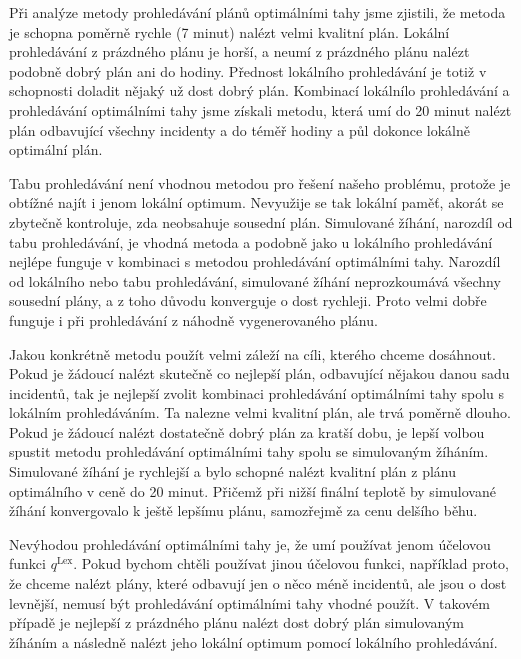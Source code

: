 Při analýze metody prohledávání plánů optimálními tahy jsme zjistili, že metoda je schopna poměrně rychle (7 minut) nalézt velmi kvalitní plán.
Lokální prohledávání z prázdného plánu je horší, a neumí z prázdného plánu nalézt podobně dobrý plán ani do hodiny.
Přednost lokálního prohledávání je totiž v schopnosti doladit nějaký už dost dobrý plán.
Kombinací lokálnílo prohledávání a prohledávání optimálními tahy jsme získali metodu,
která umí do 20 minut nalézt plán odbavující všechny incidenty a do téměř hodiny a půl dokonce lokálně optimální plán.

Tabu prohledávání není vhodnou metodou pro řešení našeho problému, protože je obtížné najít i jenom lokální optimum.
Nevyužije se tak lokální paměť, akorát se zbytečně kontroluje, zda neobsahuje sousední plán.
Simulované žíhání, narozdíl od tabu prohledávání, je vhodná metoda a podobně jako u lokálního prohledávání nejlépe funguje v kombinaci s metodou prohledávání optimálními tahy. 
Narozdíl od lokálního nebo tabu prohledávání, simulované žíhání neprozkoumává všechny sousední plány, a z toho důvodu konverguje o dost rychleji. 
Proto velmi dobře funguje i při prohledávání z náhodně vygenerovaného plánu.

Jakou konkrétně metodu použít velmi záleží na cíli, kterého chceme dosáhnout.
Pokud je žádoucí nalézt skutečně co nejlepší plán, odbavující nějakou danou sadu incidentů, tak je nejlepší zvolit kombinaci prohledávání optimálními tahy spolu s lokálním prohledáváním.
Ta nalezne velmi kvalitní plán, ale trvá poměrně dlouho.
Pokud je žádoucí nalézt dostatečně dobrý plán za kratší dobu, je lepší volbou spustit metodu prohledávání optimálními tahy spolu se simulovaným žíháním.
Simulované žíhání je rychlejší a bylo schopné nalézt kvalitní plán z plánu optimálního v ceně do 20 minut.
Přičemž při nižší finální teplotě by simulované žíhání konvergovalo k ještě lepšímu plánu, samozřejmě za cenu delšího běhu.

Nevýhodou prohledávání optimálními tahy je, že umí používat jenom účelovou funkci $q^{\text{Lex}}$.
Pokud bychom chtěli používat jinou účelovou funkci, například proto, že chceme nalézt plány, které odbavují jen o něco méně incidentů, ale jsou o dost levnější,
nemusí být prohledávání optimálními tahy vhodné použít.
V takovém případě je nejlepší z prázdného plánu nalézt dost dobrý plán simulovaným žíháním a následně nalézt jeho lokální optimum pomocí lokálního prohledávání.

